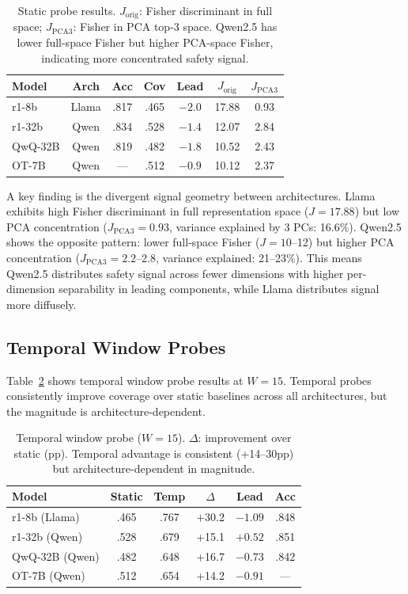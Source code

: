\documentclass[11pt,a4paper]{article}
\begin{document}
\begin{table}[t]
\centering
\small
\begin{tabular}{lcccccc}
\toprule
\textbf{Model} & \textbf{Arch} & \textbf{Acc} & \textbf{Cov} & \textbf{Lead} & \textbf{$J_\text{orig}$} & \textbf{$J_\text{PCA3}$} \\
\midrule
r1-8b & Llama & .817 & .465 & $-2.0$ & 17.88 & 0.93 \\
r1-32b & Qwen & .834 & .528 & $-1.4$ & 12.07 & 2.84 \\
QwQ-32B & Qwen & .819 & .482 & $-1.8$ & 10.52 & 2.43 \\
OT-7B & Qwen & --- & .512 & $-0.9$ & 10.12 & 2.37 \\
\bottomrule
\end{tabular}
\caption{Static probe results. $J_\text{orig}$: Fisher discriminant in full space; $J_\text{PCA3}$: Fisher in PCA top-3 space. Qwen2.5 has lower full-space Fisher but higher PCA-space Fisher, indicating more concentrated safety signal.}
\label{tab:static}
\end{table}

A key finding is the divergent signal geometry between architectures. Llama exhibits high Fisher discriminant in full representation space ($J{=}17.88$) but low PCA concentration ($J_\text{PCA3}{=}0.93$, variance explained by 3 PCs: 16.6\%). Qwen2.5 shows the opposite pattern: lower full-space Fisher ($J{=}10$--12) but higher PCA concentration ($J_\text{PCA3}{=}2.2$--2.8, variance explained: 21--23\%). This means Qwen2.5 distributes safety signal across fewer dimensions with higher per-dimension separability in leading components, while Llama distributes signal more diffusely.

\subsection{Temporal Window Probes}
\label{sec:temporal}

Table~\ref{tab:temporal} shows temporal window probe results at $W{=}15$. Temporal probes consistently improve coverage over static baselines across all architectures, but the magnitude is architecture-dependent.

\begin{table}[t]
\centering
\small
\begin{tabular}{lccccc}
\toprule
\textbf{Model} & \textbf{Static} & \textbf{Temp} & \textbf{$\Delta$} & \textbf{Lead} & \textbf{Acc} \\
\midrule
r1-8b (Llama) & .465 & .767 & +30.2 & $-1.09$ & .848 \\
r1-32b (Qwen) & .528 & .679 & +15.1 & $+0.52$ & .851 \\
QwQ-32B (Qwen) & .482 & .648 & +16.7 & $-0.73$ & .842 \\
OT-7B (Qwen) & .512 & .654 & +14.2 & $-0.91$ & --- \\
\bottomrule
\end{tabular}
\caption{Temporal window probe ($W{=}15$). $\Delta$: improvement over static (pp). Temporal advantage is consistent (+14--30pp) but architecture-dependent in magnitude.}
\label{tab:temporal}
\end{table}
\end{document}
